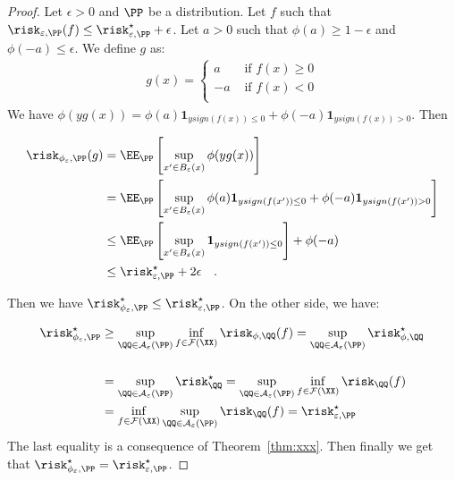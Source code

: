\begin{proof}
Let $\epsilon>0$ and $\PP$ be a distribution. Let $f$ such that $\risk_{\varepsilon,\PP}(f) \leq \risk_{\varepsilon,\PP}^\star +\epsilon$. Let $a>0$ such that $\phi(a)\geq 1-\epsilon$ and $\phi(-a)\leq\epsilon$. We define $g$ as: 
\begin{align*}
     g(x)= \left\{
    \begin{array}{ll}
    a&\text{ if } f(x)\geq 0\\
    -a&\text{ if } f(x)< 0\\
  \end{array}
  \right.
\end{align*}
We have $\phi(yg(x)) = \phi(a) \mathbf{1}_{y sign(f(x))\leq 0}+  \phi(-a) \mathbf{1}_{y sign(f(x))>0}$. Then

\begin{align*}
  \risk_{\phi_\varepsilon,\PP}(g) & = \EE_\PP\left[\sup_{x'\in B_\varepsilon(x)}\phi(yg(x))\right]\\
  & = \EE_\PP\left[\sup_{x'\in B_\varepsilon(x)}\phi(a) \mathbf{1}_{y sign(f(x'))\leq 0}+  \phi(-a) \mathbf{1}_{y sign(f(x'))>0}\right]\\
  &\leq  \EE_\PP\left[\sup_{x'\in B_\varepsilon(x)}\mathbf{1}_{y sign(f(x'))\leq 0}\right]+\phi(-a)\\
  &\leq \risk_{\varepsilon,\PP}^\star + 2\epsilon\quad.
\end{align*}

Then we have $\risk_{\phi_\varepsilon,\PP}^\star\leq \risk_{\varepsilon,\PP}^\star$.
On the other side, we have: 

\begin{align*}
 \risk_{\phi_\varepsilon,\PP}^\star & \geq \sup_{\QQ\in\mathcal{A}_\varepsilon(\PP)}  \inf_{f\in\mathcal{F}(\XX)} \risk_{\phi,\QQ}(f) = \sup_{\QQ\in\mathcal{A}_\varepsilon(\PP)}  \risk_{\phi,\QQ}^\star\\
  \\ &= \sup_{\QQ\in\mathcal{A}_\varepsilon(\PP)}  \risk_{\QQ}^\star= \sup_{\QQ\in\mathcal{A}_\varepsilon(\PP)}\inf_{f\in\mathcal{F}(\XX)} \risk_{\QQ}(f)  \\
  & =  \inf_{f\in\mathcal{F}(\XX)} \sup_{\QQ\in\mathcal{A}_\varepsilon(\PP)}\risk_{\QQ}(f) = \risk_{\varepsilon,\PP}^\star \\
\end{align*}
The last equality is a consequence of Theorem~\ref{thm:xxx}. Then finally we get that $\risk_{\phi_\varepsilon,\PP}^\star=  \risk_{\varepsilon,\PP}^\star$.

\end{proof}

